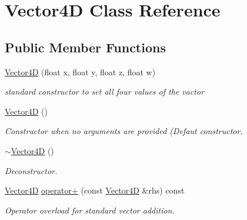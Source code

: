 \hypertarget{class_vector4_d}{}\section{Vector4D Class Reference}
\label{class_vector4_d}
\subsection*{Public Member Functions}
\begin{DoxyCompactItemize}
\item 
\mbox{\label{class_vector4_d_a2b85bf633815254224596e09baa1a1ab}} 
\mbox{\hyperlink{class_vector4_d_a2b85bf633815254224596e09baa1a1ab}{Vector4D}} (float x, float y, float z, float w)
\begin{DoxyCompactList}\small\item\em standard constructor to set all four values of the vactor \end{DoxyCompactList}\item 
\mbox{\label{class_vector4_d_a097dbad3d594f84c02857ea4b63c8186}} 
\mbox{\hyperlink{class_vector4_d_a097dbad3d594f84c02857ea4b63c8186}{Vector4D}} ()
\begin{DoxyCompactList}\small\item\em Constructor when no arguments are provided (Defaut constructor. \end{DoxyCompactList}\item 
\mbox{\label{class_vector4_d_a273478ee200d57eaf8c140a25b4d74e5}} 
\mbox{\hyperlink{class_vector4_d_a273478ee200d57eaf8c140a25b4d74e5}{$\sim$\+Vector4D}} ()
\begin{DoxyCompactList}\small\item\em Deconstructor. \end{DoxyCompactList}\item 
\mbox{\label{class_vector4_d_a9c815702d24a178786abd191276515c9}} 
\mbox{\hyperlink{class_vector4_d}{Vector4D}} \mbox{\hyperlink{class_vector4_d_a9c815702d24a178786abd191276515c9}{operator+}} (const \mbox{\hyperlink{class_vector4_d}{Vector4D}} \&rhs) const
\begin{DoxyCompactList}\small\item\em Operator overload for standard vector addition. \end{DoxyCompactList}\item 

\end{DoxyCompactItemize}
